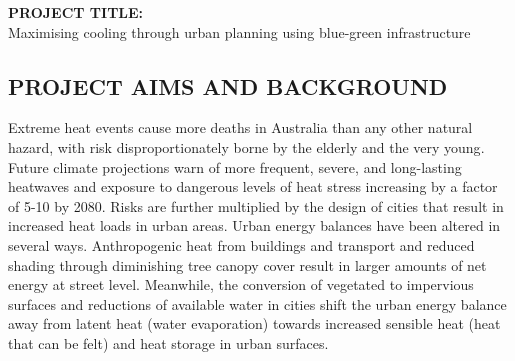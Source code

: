 %
%
%
%
%
%
%
%
%
%
%
%

\noindent \textbf{PROJECT TITLE: }\\ \noindent Maximising cooling through urban planning using blue-green infrastructure

\subsection*{\TitleFont PROJECT AIMS AND BACKGROUND}



Extreme heat events cause more deaths in Australia than any other natural hazard\cite{Coates2014}, with risk disproportionately borne by the elderly and the very young\cite{Nicholls2008}. Future climate projections warn of more frequent, severe, and long-lasting heatwaves\cite{IPCC2013a} and exposure to dangerous levels of heat stress increasing by a factor of 5-10 by 2080\cite{Coffel2018}. Risks are further multiplied by the design of cities\cite{Coutts2012,Martilli2020} that result in increased heat loads in urban areas. Urban energy balances have been altered in several ways\cite{Oke1982}. Anthropogenic heat from buildings and transport and reduced shading through diminishing tree canopy cover result in larger amounts of net energy at street level. Meanwhile, the conversion of vegetated to impervious surfaces and reductions of available water in cities shift the urban energy balance away from latent heat (water evaporation) towards increased sensible heat (heat that can be felt) and heat storage in urban surfaces. 

